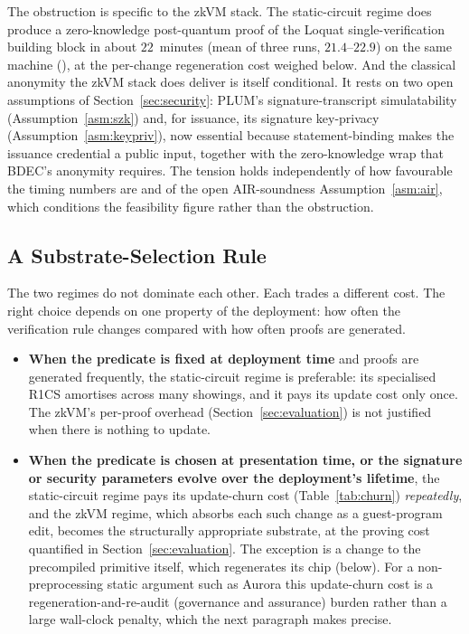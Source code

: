The obstruction is specific to the zkVM stack. The static-circuit regime does produce a zero-knowledge post-quantum proof of the Loquat single-verification building block in about $22$~minutes (mean of three runs, $21.4$--$22.9$) on the same machine (), at the per-change regeneration cost weighed below. And the classical anonymity the zkVM stack does deliver is itself conditional. It rests on two open assumptions of Section~\ref{sec:security}: PLUM's signature-transcript simulatability (Assumption~\ref{asm:szk}) and, for issuance, its signature key-privacy (Assumption~\ref{asm:keypriv}), now essential because statement-binding makes the issuance credential a public input, together with the zero-knowledge wrap that BDEC's anonymity requires. The tension holds independently of how favourable the timing numbers are and of the open AIR-soundness Assumption~\ref{asm:air}, which conditions the feasibility figure rather than the obstruction.

\subsection{A Substrate-Selection Rule}\label{ssec:decision}
The two regimes do not dominate each other. Each trades a different cost. The right choice depends on one property of the deployment: how often the verification rule changes compared with how often proofs are generated.

\begin{itemize}
  \item \textbf{When the predicate is fixed at deployment time} and proofs are generated frequently, the static-circuit regime is preferable: its specialised R1CS amortises across many showings, and it pays its update cost only once. The zkVM's per-proof overhead (Section~\ref{sec:evaluation}) is not justified when there is nothing to update.
  \item \textbf{When the predicate is chosen at presentation time, or the signature or security parameters evolve over the deployment's lifetime}, the static-circuit regime pays its update-churn cost (Table~\ref{tab:churn}) \emph{repeatedly}, and the zkVM regime, which absorbs each such change as a guest-program edit, becomes the structurally appropriate substrate, at the proving cost quantified in Section~\ref{sec:evaluation}. The exception is a change to the precompiled primitive itself, which regenerates its chip (below). For a non-preprocessing static argument such as Aurora this update-churn cost is a regeneration-and-re-audit (governance and assurance) burden rather than a large wall-clock penalty, which the next paragraph makes precise.
\end{itemize}

